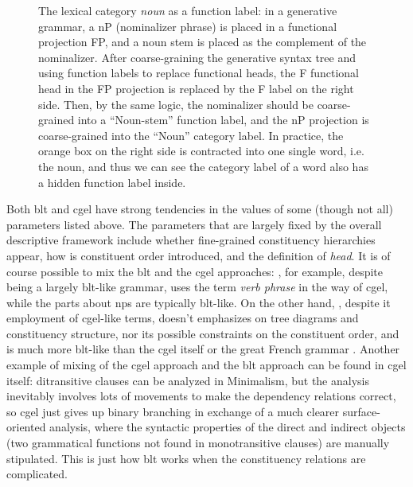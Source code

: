 \documentclass[UTF8, a4paper, oneside, scheme=plain]{ctexart}
\newcommand*{\term}[1]{\emph{#1}}
\begin{document}
\begin{figure}
    \centering
    
    \caption{The lexical category \term{noun} as a function label:
    in a generative grammar, a nP (nominalizer phrase) is placed in a functional projection FP,
    and a noun stem is placed as the complement of the nominalizer.
    After coarse-graining the generative syntax tree 
    and using function labels to replace functional heads,
    the F functional head in the FP projection is replaced by the F label on the right side.
    Then, by the same logic, 
    the nominalizer should be coarse-grained into a ``Noun-stem'' function label,
    and the nP projection is coarse-grained into the ``Noun'' category label.
    In practice, the orange box on the right side
    is contracted into one single word, i.e. the noun,
    and thus we can see the category label of a word also has a hidden function label inside.}
    \label{fig:noun-function}
\end{figure}

Both \ac{blt} and \ac{cgel} 
have strong tendencies in the values of some (though not all) parameters listed above.
The parameters that are largely fixed by the overall descriptive framework 
include whether fine-grained constituency hierarchies appear,
how is constituent order introduced,
and the definition of \term{head}.
It is of course possible to mix the \ac{blt} and the \ac{cgel} approaches:
\citet{Friesen2017}, for example, despite being a largely \ac{blt}-like grammar,
uses the term \term{verb phrase} in the way of \ac{cgel},
while the parts about \ac{np}s are typically \ac{blt}-like.
On the other hand, \citet{munoz2000gramatica2}, 
despite it employment of \ac{cgel}-like terms,
doesn't emphasizes on tree diagrams and 
constituency structure, nor its possible constraints on the constituent order,
and is much more \ac{blt}-like than the \ac{cgel} itself or the great French grammar \citep{abeille2021grande}.
Another example of mixing of the \ac{cgel} approach and the \ac{blt} approach
can be found in \ac{cgel} itself:
ditransitive clauses can be analyzed in Minimalism,
but the analysis inevitably involves lots of movements
to make the dependency relations correct,
so \ac{cgel} just gives up binary branching in exchange of a much clearer surface-oriented analysis,
where the syntactic properties of the direct and indirect objects 
(two grammatical functions not found in monotransitive clauses)
are manually stipulated.
This is just how \ac{blt} works when the constituency relations are complicated.
\end{document}
